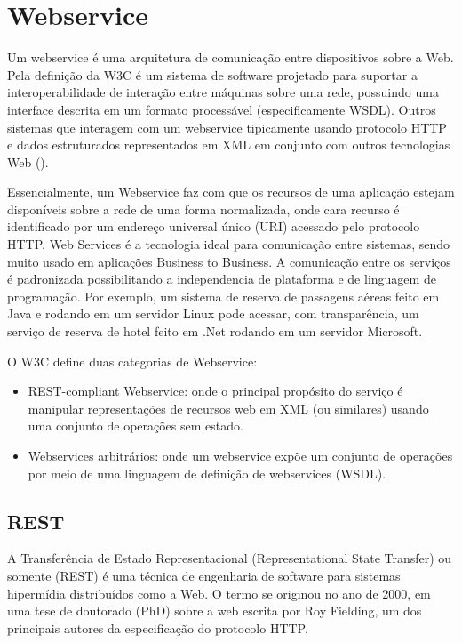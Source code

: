\section{Webservice}

Um webservice é uma arquitetura de comunicação entre dispositivos sobre a Web. Pela definição da W3C é um sistema de software projetado para suportar a interoperabilidade de interação entre máquinas sobre uma rede, possuindo uma interface descrita em um formato processável (especificamente WSDL). Outros sistemas que interagem com um webservice tipicamente usando protocolo HTTP e dados estruturados representados em XML em conjunto com outros tecnologias Web (\textcite{w3c_ws:2004}).

Essencialmente, um Webservice faz com que os recursos de uma aplicação estejam disponíveis sobre a rede de uma forma normalizada, onde cara recurso é identificado por um endereço universal único (URI) acessado pelo protocolo HTTP. Web Services é a tecnologia ideal para comunicação entre sistemas, sendo muito usado em aplicações Business to Business. A comunicação entre os serviços é padronizada possibilitando a independencia de plataforma e de linguagem de programação. Por exemplo, um sistema de reserva de passagens aéreas feito em Java e rodando em um servidor Linux pode acessar, com transparência, um serviço de reserva de hotel feito em .Net rodando em um servidor Microsoft.

O W3C define duas categorias de Webservice:

\begin{itemize}
	\item REST-compliant Webservice: onde o principal propósito do serviço é manipular representações de recursos web em XML (ou similares) usando uma conjunto de operações sem estado.
		\item Webservices arbitrários: onde um webservice expõe um conjunto de operações por meio de uma linguagem de definição de webservices (WSDL).
\end{itemize}

\subsection{REST}

A Transferência de Estado Representacional (Representational State Transfer) ou somente (REST) é uma técnica de engenharia de software para sistemas hipermídia distribuídos como a Web. O termo se originou no ano de 2000, em uma tese de doutorado (PhD) sobre a web escrita por Roy Fielding, um dos principais autores da especificação do protocolo HTTP.

